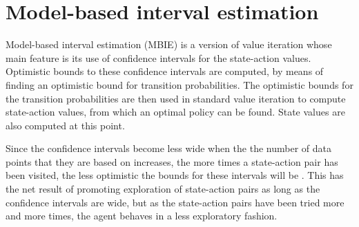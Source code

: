\section{Model-based interval estimation}
\label{sec:mbie}

Model-based interval estimation (MBIE) is a version of value iteration whose main
feature is its use of confidence intervals for the state-action values.
Optimistic bounds to these confidence intervals are computed, by means of
finding an optimistic bound for transition probabilities. The optimistic bounds
for the transition probabilities are then used in standard value iteration to
compute state-action values, from which an optimal policy can be found. State
values are also computed at this point.

Since the confidence intervals become less wide when the the number of data
points that they are based on increases, the more times a state-action pair
has been visited, the less optimistic the bounds for these intervals will be
\parencite{dietterich2013pac}. This has the net result of promoting
exploration of state-action pairs as long as the confidence intervals are
wide, but as the state-action pairs have been tried more and more times, the
agent behaves in a less exploratory fashion. 


\begin{comment}
Model-based interval estimation is a modification of value iteration whose main feature is its  addition of confidence
intervals to the state-action values. These confidence intervals allow the agent to choose between
actions, based on how confident it is about its evaluation of them. In effect,
the less certain the agent is about its evaluation of the states and actions,
the more exploratory the actions will be. When the agent is more confident
however, it will exploit what it has learned so far about the MDP
\parencite{dietterich2013pac}.
\end{comment}





